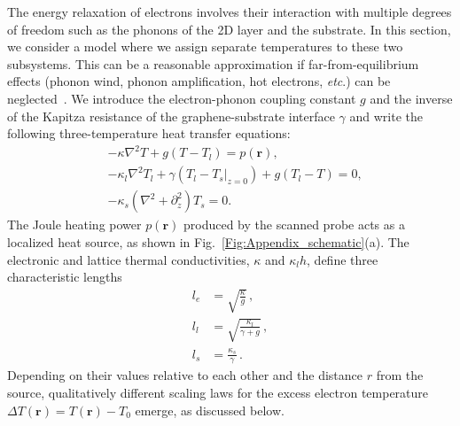 \documentclass[aps, prb, reprint, superscriptaddress]{revtex4-2}
\renewcommand{\vec}{\mathbf}
\begin{document}
The energy relaxation of electrons involves
their interaction with multiple degrees of freedom such as the phonons of the 2D layer and the substrate. 
In this section, we consider a model where we assign separate temperatures to these two subsystems. 
This can be a reasonable approximation if far-from-equilibrium effects (phonon wind, phonon amplification, hot electrons, \textit{etc}.) can be neglected~\cite{Gurevich1989, Andersen2019,Massicotte2021}. 
We introduce the electron-phonon coupling constant $g$ and the inverse of the Kapitza resistance of the graphene-substrate interface $\gamma$ and
write the following three-temperature heat transfer equations:
\begin{align}
&-\kappa \nabla^2 T + g(T - T_{l}) = p(\vec{r}),
\label{eqn:T1}\\
		&-\kappa_{l}\nabla^2 T_{l} + \gamma (T_{l} - T_{s}|_{z = 0}) 
+ g (T_{l} - T) = 0,
\label{eqn:T2}\\
& -\kappa_{s}\left( \nabla^2 + \partial_z^2\right) T_{s} = 0.
\label{eqn:T3}
\end{align}
The Joule heating power $p(\vec{r})$ produced by the scanned probe 
acts as a localized heat source, as shown in Fig.~\ref{Fig:Appendix_schematic}(a).
The electronic and lattice thermal conductivities, $\kappa$ and $\kappa_{l} h$, define three characteristic lengths
\begin{align}
 l_{e} &= \sqrt{\frac{\kappa}{g}}\,,
\label{eqn:l_e}
 \\
 l_l &= \sqrt{\frac{\kappa_{l}}{\gamma + g}}\,,
\label{eqn:l_l}
 \\
l_s &= \frac{\kappa_s}{\gamma}\,. 
\label{eqn:l_s}
\end{align} 
Depending on their values relative to each other and the distance $r$ from the source,
qualitatively different scaling laws for the excess electron temperature $\Delta T(\vec{r}) = T(\vec{r}) - T_0$ emerge, as discussed below. 
\end{document}
